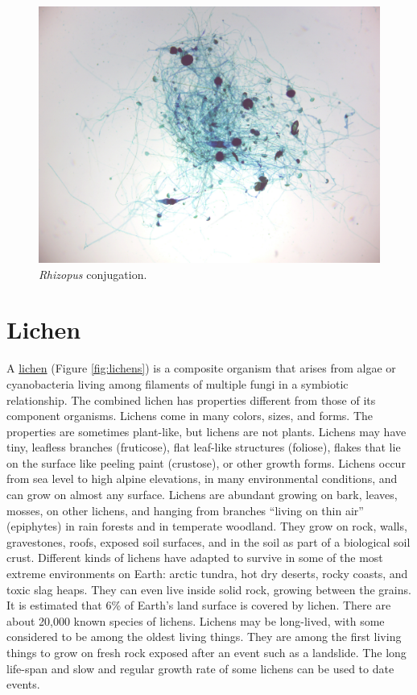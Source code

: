 \begin{figure}

{\centering \includegraphics[width=0.7\linewidth]{./figures/fungi/rhizopus_conjugation}

}

\caption{\emph{Rhizopus} conjugation.}\label{fig:rhizopusconjugation}
\end{figure}

\section{Lichen}\label{lichen}

A \href{https://en.wikipedia.org/wiki/Lichen}{lichen} (Figure
\ref{fig:lichens}) is a composite organism that arises from algae or
cyanobacteria living among filaments of multiple fungi in a symbiotic
relationship. The combined lichen has properties different from those of
its component organisms. Lichens come in many colors, sizes, and forms.
The properties are sometimes plant-like, but lichens are not plants.
Lichens may have tiny, leafless branches (fruticose), flat leaf-like
structures (foliose), flakes that lie on the surface like peeling paint
(crustose), or other growth forms. Lichens occur from sea level to high
alpine elevations, in many environmental conditions, and can grow on
almost any surface. Lichens are abundant growing on bark, leaves,
mosses, on other lichens, and hanging from branches ``living on thin
air'' (epiphytes) in rain forests and in temperate woodland. They grow
on rock, walls, gravestones, roofs, exposed soil surfaces, and in the
soil as part of a biological soil crust. Different kinds of lichens have
adapted to survive in some of the most extreme environments on Earth:
arctic tundra, hot dry deserts, rocky coasts, and toxic slag heaps. They
can even live inside solid rock, growing between the grains. It is
estimated that 6\% of Earth's land surface is covered by lichen. There
are about 20,000 known species of lichens. Lichens may be long-lived,
with some considered to be among the oldest living things. They are
among the first living things to grow on fresh rock exposed after an
event such as a landslide. The long life-span and slow and regular
growth rate of some lichens can be used to date events.




